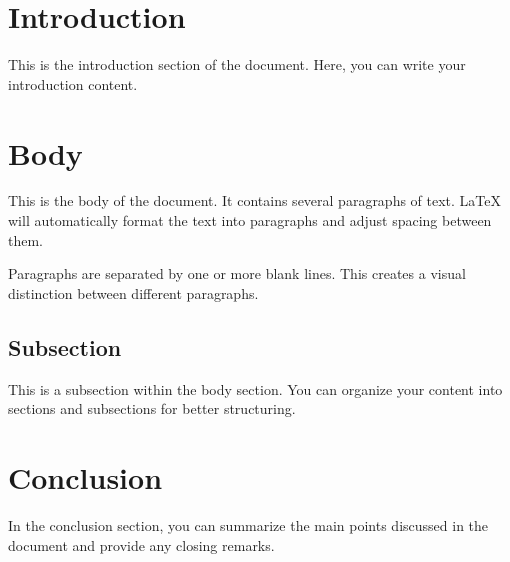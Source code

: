 \documentclass{article}
\begin{document}

\section{Introduction}

This is the introduction section of the document. Here, you can write your introduction content.

\section{Body}

This is the body of the document. It contains several paragraphs of text. LaTeX will automatically format the text into paragraphs and adjust spacing between them.

Paragraphs are separated by one or more blank lines. This creates a visual distinction between different paragraphs.

\subsection{Subsection}

This is a subsection within the body section. You can organize your content into sections and subsections for better structuring.


\section{Conclusion}

In the conclusion section, you can summarize the main points discussed in the document and provide any closing remarks.
\end{document}
